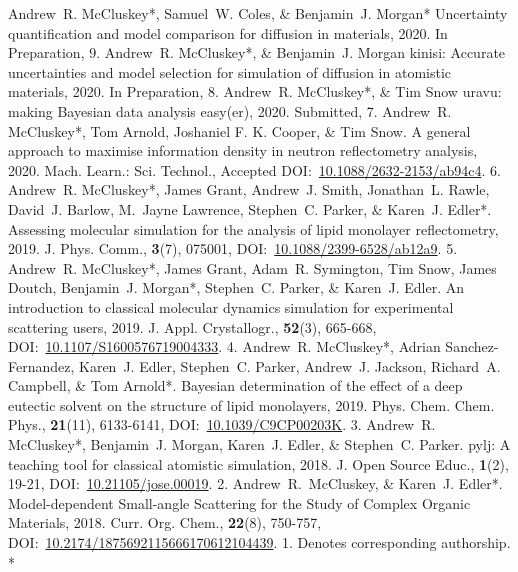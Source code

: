 \begin{cvpubys}
  \cvpuby
    {Andrew~R. McCluskey*, Samuel~W. Coles, \& Benjamin~J. Morgan*}
    {Uncertainty quantification and model comparison for diffusion in materials,}
    {2020.}
    {In Preparation,}
    {}
    {}
    {9.}
  \cvpuby
    {Andrew~R. McCluskey*, \& Benjamin~J. Morgan}
    {kinisi: Accurate uncertainties and model selection for simulation of diffusion in atomistic materials,}
    {2020.}
    {In Preparation,}
    {}
    {}
    {8.}
  \cvpuby
    {Andrew~R. McCluskey*, \& Tim Snow}
    {uravu: making Bayesian data analysis easy(er),}
    {2020.}
    {Submitted,}
    {}
    {}
    {7.}
  \cvpuby
    {\vspace{-0.4cm}Andrew~R. McCluskey*, Tom Arnold, Joshaniel F. K. Cooper, \& Tim Snow.}
    {A general approach to maximise information density in neutron reflectometry analysis,}
    {2020.}
    {Mach. Learn.: Sci. Technol.,}
    {Accepted}
    {DOI:~\href{https://doi.org/10.1088/2632-2153/ab94c4}{10.1088/2632-2153/ab94c4}.}
    {\vspace{-0.4cm}6.}
  \cvpuby
    {Andrew~R. McCluskey*, James Grant, Andrew~J. Smith, Jonathan~L. Rawle, David~J. Barlow, M.~Jayne Lawrence, Stephen~C. Parker, \& Karen~J. Edler*.}
    {Assessing molecular simulation for the analysis of lipid monolayer reflectometry,}
    {2019.}
    {J. Phys. Comm.,}
    {\textbf{3}(7), 075001,}
    {DOI:~\href{https://doi.org/10.1088/2399-6528/ab12a9}{10.1088/2399-6528/ab12a9}.}
    {5.}
  \cvpuby
    {Andrew~R. McCluskey*, James Grant, Adam~R. Symington, Tim Snow, James Doutch, Benjamin~J. Morgan*, Stephen~C. Parker, \& Karen~J. Edler.}
    {An introduction to classical molecular dynamics simulation for experimental scattering users,}
    {2019.}
    {J. Appl. Crystallogr.,}
    {\textbf{52}(3), 665-668,}
    {DOI:~\href{https://doi.org/10.1107/S1600576719004333}{10.1107/S1600576719004333}.}
    {4.}
  \cvpuby
    {Andrew~R. McCluskey*, Adrian Sanchez-Fernandez, Karen~J. Edler, Stephen~C. Parker, Andrew~J. Jackson, Richard~A. Campbell, \& Tom Arnold*.}
    {Bayesian determination of the effect of a deep eutectic solvent on the structure of lipid monolayers,}
    {2019.}
    {Phys. Chem. Chem. Phys.,}
    {\textbf{21}(11), 6133-6141,}
    {DOI:~\href{https://doi.org/10.1039/C9CP00203K}{10.1039/C9CP00203K}.}
    {3.}
  \cvpuby
    {Andrew~R. McCluskey*, Benjamin~J. Morgan, Karen~J. Edler, \& Stephen~C. Parker.}
    {pylj: A teaching tool for classical atomistic simulation,}
    {2018.}
    {J. Open Source Educ.,}
    {\textbf{1}(2), 19-21,}
    {DOI:~\href{http://doi.org/10.21105/jose.00019}{10.21105/jose.00019}.}
    {2.}
  \cvpuby
    {Andrew~R.~McCluskey, \& Karen~J. Edler*.}
    {Model-dependent Small-angle Scattering for the Study of Complex Organic Materials,}
    {2018.}
    {Curr. Org. Chem.,}
    {\textbf{22}(8), 750-757,}
    {DOI:~\href{http://doi.org/10.2174/1875692115666170612104439}{10.2174/1875692115666170612104439}.}
    {1.}
  \cvpuby
    {Denotes corresponding authorship.}
    {}
    {}
    {}
    {}
    {}
    {*}
\end{cvpubys}
